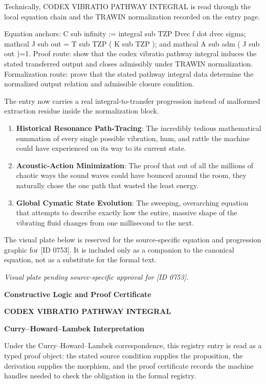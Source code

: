 Technically, CODEX VIBRATIO PATHWAY INTEGRAL is read through the local equation chain and the TRAWIN normalization recorded on the entry page.

Equation anchors: C sub infinity := integral sub TZP Dvec f dot dvec sigma; mathcal J sub out = T sub TZP ( K sub TZP ); and mathcal A sub adm ( J sub out )=1. Proof route: show that the codex vibratio pathway integral induces the stated transferred output and closes admissibly under TRAWIN normalization. Formalization route: prove that the stated pathway integral data determine the normalized output relation and admissible closure condition.

The entry now carries a real integral-to-transfer progression instead of malformed extraction residue inside the normalization block.
\endgroup

\begin{enumerate}[leftmargin=1.6em,itemsep=6pt,topsep=4pt]
\item \textbf{Historical Resonance Path-Tracing}: The incredibly tedious mathematical summation of every single possible vibration, hum, and rattle the machine could have experienced on its way to its current state.
\item \textbf{Acoustic-Action Minimization}: The proof that out of all the millions of chaotic ways the sound waves could have bounced around the room, they naturally chose the one path that wasted the least energy.
\item \textbf{Global Cymatic State Evolution}: The sweeping, overarching equation that attempts to describe exactly how the entire, massive shape of the vibrating fluid changes from one millisecond to the next.
\end{enumerate}

\begingroup\footnotesize\sloppy
The visual plate below is reserved for the source-specific equation and progression graphic for [ID 0753]. It is included only as a companion to the canonical equation, not as a substitute for the formal text.
\par\endgroup
\begingroup\footnotesize\itshape
Visual plate pending source-specific approval for [ID 0753].
\par\endgroup

\clearpage
\begingroup\tzpsupportsetup
\noindent\textbf{\fontsize{10.8pt}{12.8pt}\selectfont [ID 0753] Constructive Logic and Proof Certificate}\par
\noindent\textbf{\fontsize{10pt}{12pt}\selectfont CODEX VIBRATIO PATHWAY INTEGRAL}\par
\vspace{0.45em}
\begingroup
\footnotesize
\setlength{\parskip}{0.22em}
\setlength{\parindent}{0pt}
\noindent\textbf{Curry--Howard--Lambek Interpretation}\par
Under the Curry--Howard--Lambek correspondence, this registry entry is read as a typed proof
object: the stated source condition supplies the proposition, the derivation supplies the
morphism, and the proof certificate records the machine handles needed to check the obligation
in the formal registry.

